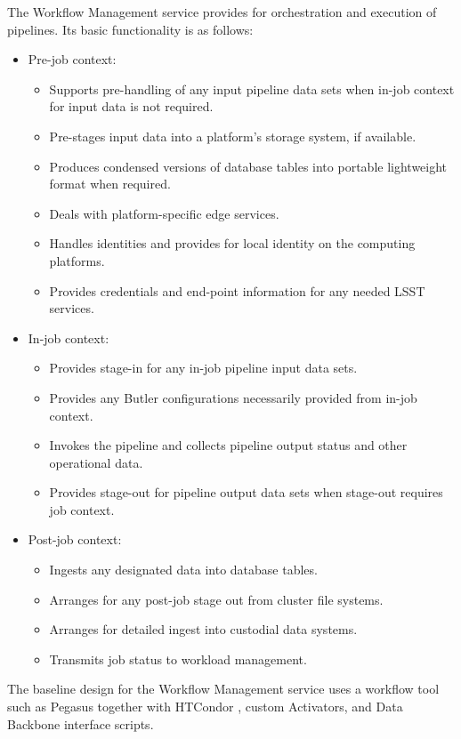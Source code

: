 \documentclass[DM,toc]{lsstdoc}
\begin{document}
The Workflow Management service provides for orchestration and execution of
pipelines.  Its basic functionality is as follows:
\begin{itemize}
	\item Pre-job context:
		\begin{itemize}
			\item Supports pre-handling of any input pipeline data sets when in-job context for input data is not required.
			\item Pre-stages input data into a platform’s storage system, if available.
			\item Produces condensed versions of database tables into portable lightweight format when required.
			\item Deals with platform-specific edge services.
			\item Handles identities and provides for local identity on the computing platforms.
			\item Provides credentials and end-point information for any needed LSST services.
		\end{itemize}
	\item In-job context:
		\begin{itemize}
			\item Provides stage-in for any in-job pipeline input data sets.
			\item Provides any Butler configurations necessarily provided from in-job context.
			\item Invokes the pipeline and collects pipeline output status and other operational data.
			\item Provides stage-out for pipeline output data sets when stage-out requires job context.
		\end{itemize}
	\item Post-job context:
		\begin{itemize}
			\item Ingests any designated data into database tables.
			\item Arranges for any post-job stage out from cluster file systems.
			\item Arranges for detailed ingest into custodial data systems.
			\item Transmits job status to workload management.
		\end{itemize}
\end{itemize}

The baseline design for the Workflow Management service uses a workflow tool
such as Pegasus \citep{Pegasus} together with HTCondor \citep{HTCondor}, custom
Activators, and Data Backbone interface scripts.
\end{document}
